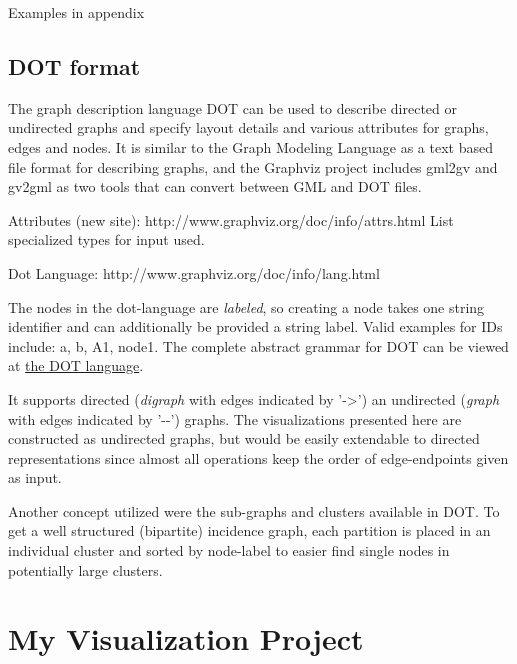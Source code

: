 \documentclass[a4paper, 12pt]{scrartcl}
\begin{document}
Examples in appendix

\subsection{DOT format}
The graph description language DOT can be used to describe directed or undirected graphs and specify layout details and various attributes for graphs, edges and nodes. It is similar to the Graph Modeling Language as a text based file format for describing graphs, and the Graphviz project includes gml2gv and gv2gml as two tools that can convert between GML and DOT files.

Attributes (new site): http://www.graphviz.org/doc/info/attrs.html
List specialized types for input used.

Dot Language: http://www.graphviz.org/doc/info/lang.html

The nodes in the dot-language are \emph{labeled}, so creating a node takes one string identifier and
can additionally be provided a string label. Valid examples for IDs include: a, b, A1, node1.
The complete abstract grammar for DOT can be viewed at \href{https://graphviz.gitlab.io/_pages/doc/info/lang.html}{the DOT language}.

It supports directed (\textit{digraph} with edges indicated by '->') an undirected (\textit{graph} with edges indicated by '-{}-') graphs.
The visualizations presented here are constructed as undirected graphs, but would be easily extendable to directed representations since almost all operations keep the order of edge-endpoints given as input.

Another concept utilized were the sub-graphs and clusters available in DOT.
To get a well structured (bipartite) incidence graph, each partition is placed in an individual cluster
and sorted by node-label to easier find single nodes in potentially large clusters.


\newpage
\section{My Visualization Project}
\end{document}
